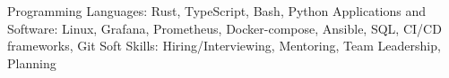 
\begin{cvskills}
  \cvskill
    {Programming Languages:}
    {Rust, TypeScript, Bash, Python}
  \cvskill
    {Applications and Software:}
    {Linux, Grafana, Prometheus, Docker-compose, Ansible, SQL, CI/CD frameworks, Git}
  \cvskill
    {Soft Skills:}
    {Hiring/Interviewing, Mentoring, Team Leadership, Planning}
\end{cvskills}
